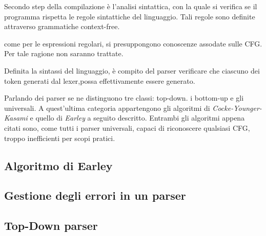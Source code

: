 \documentclass{subfiles}
\begin{document}
Secondo step della compilazione è l'analisi sintattica, con la quale si verifica se il programma rispetta le regole sintattiche del linguaggio.
Tali regole sono definite attraverso grammatiche context-free.

\begin{Note*}
    come per le espressioni regolari, si presuppongono conoscenze assodate sulle CFG.
    Per tale ragione non saranno trattate.
\end{Note*}
Definita la sintassi del linguaggio, è compito del parser verificare che ciascuno dei token generati dal lexer,possa effettivamente essere generato.

Parlando dei parser se ne distinguono tre classi: top-down. i bottom-up e gli universali.
A quest'ultima categoria appartengono gli algoritmi di \emph{Cocke-Younger-Kasami} e quello di \emph{Earley} a seguito descritto.
Entrambi gli algoritmi appena citati sono, come tutti i parser universali, capaci di riconoscere qualsiasi CFG, troppo inefficienti per scopi pratici.

\subsection{Algoritmo di Earley}

\clearpage

\subsection{Gestione degli errori in un parser}


\subsection{Top-Down parser}

\end{document}
